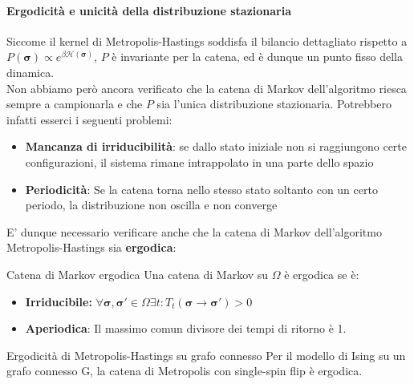 \paragraph{Ergodicità e unicità della distribuzione stazionaria}
Siccome il kernel di Metropolis-Hastings soddisfa il bilancio dettagliato rispetto a $P(\mathbf{\sigma}) \propto e^{\beta \mathcal{H}(\mathbf{\sigma})}$, $P$ è invariante per la catena, ed è dunque un punto fisso della dinamica.\\
Non abbiamo però ancora verificato che la catena di Markov dell'algoritmo riesca sempre a campionarla e che $P$ sia l'unica distribuzione stazionaria. Potrebbero infatti esserci i seguenti problemi:
\begin{itemize}
    \item \textbf{Mancanza di irriducibilità}: se dallo stato iniziale non si raggiungono certe configurazioni, il sistema rimane intrappolato in una parte dello spazio
    \item \textbf{Periodicità}: Se la catena torna nello stesso stato soltanto con un certo periodo, la distribuzione non oscilla e non converge
\end{itemize}
E' dunque necessario verificare anche che la catena di Markov dell'algoritmo Metropolis-Hastings sia \textbf{ergodica}:
\begin{boxb}{Catena di Markov ergodica}
    Una catena di Markov su $\Omega$ è ergodica se è:
    \begin{itemize}
        \item \textbf{Irriducibile:} $\forall \mathbf{\sigma}, \mathbf{\sigma}' \in \Omega \exists t : T_t(\mathbf{\sigma} \to \mathbf{\sigma}') >0$
        \item \textbf{Aperiodica}: Il massimo comun divisore dei tempi di ritorno è 1.
    \end{itemize}
\end{boxb}
\begin{boxl}{Ergodicità di Metropolis-Hastings su grafo connesso}
    Per il modello di Ising su un grafo connesso G, la catena di Metropolis con single-spin flip è ergodica.
\end{boxl}
